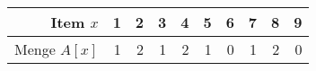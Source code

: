 \begin{tabular}{|r|rrrrrrrrr|}
\hline
Item $x$ & 1 & 2 & 3 & 4 & 5 & 6 & 7 & 8 & 9\\
\hline
Menge $A[x]$ & 1 & 2 & 1 & 2 & 1 & 0 & 1 & 2 & 0\\
\hline
\end{tabular}%
